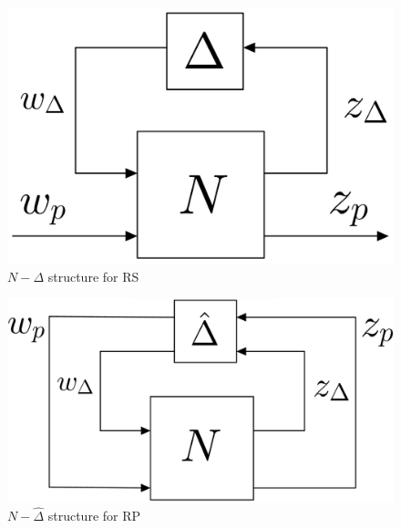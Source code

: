 \documentclass[a4paper, 12pt]{article}
\begin{document}
\newpage
\begin{multicols}{2}
    \begin{figure}[H]
        \centering
        \includegraphics[scale=0.12]{img/NDelta.jpg}
        \caption{$N-\Delta$ structure for RS}
        \label{fig:NDelta}
    \end{figure} 
    \newcolumn
    \begin{figure}[H]
        \centering
        \includegraphics[scale=0.12]{img/NDeltahat.jpg}
        \caption{$N-\hat{\Delta}$ structure for RP}
    \end{figure}
\end{multicols}
\end{document}
